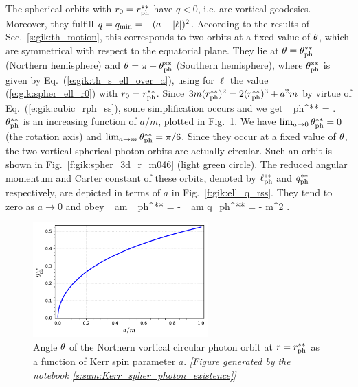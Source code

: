The spherical orbits with $r_0 = r_{\rm ph}^{**}$ have
$q < 0$, i.e. are vortical geodesics. Moreover, they fulfill $q=q_{\rm min}=-(a - |\ell|)^2$.
According to the results of Sec.~\ref{s:gik:th_motion}, this corresponds to two orbits at
a fixed value of $\theta$, which are symmetrical with respect to the equatorial plane.
They lie at $\theta = \theta_{\rm ph}^{**}$ (Northern hemisphere) and
$\theta = \pi - \theta_{\rm ph}^{**}$ (Southern hemisphere), where
$\theta_{\rm ph}^{**}$ is given by Eq.~(\ref{e:gik:th_s_ell_over_a}), using
for $\ell$ the value (\ref{e:gik:spher_ell_r0}) with $r_0 = r_{\rm ph}^{**}$.
Since $3 m (r_{\rm ph}^{**})^2 = 2 (r_{\rm ph}^{**})^3 + a^2 m$ by virtue of
Eq.~(\ref{e:gik:cubic_rph_ss}), some simplification occurs and we get
\be
    \th_{\rm ph}^{**} =  \arcsin{} .
\ee
$\theta_{\rm ph}^{**}$ is an increasing function of $a/m$, plotted in Fig.~\ref{f:gik:theta_ss}.
We have $\lim_{a\to 0} \theta_{\rm ph}^{**} = 0$ (the rotation axis) and
$\lim_{a\to m} \theta_{\rm ph}^{**} = \pi/6$.
Since they occur at a fixed value of $\theta$, the two vortical spherical photon orbits
are actually circular. Such an orbit is shown in Fig.~\ref{f:gik:spher_3d_r_m046}
(light green circle).
The reduced angular momentum and Carter constant of these orbits,
denoted by $\ell_{\rm ph}^{**}$ and
$q_{\rm ph}^{**}$ respectively,
are depicted in terms of $a$ in Fig.~\ref{f:gik:ell_q_rss}.
They tend to zero as $a\to 0$ and obey
\be
    \lim_{a\to m} \ell_{\rm ph}^{**} = -  \qand
    \lim_{a\to m} q_{\rm ph}^{**} = -  m^2 .
\ee

\begin{figure}
\centerline{\includegraphics[width=0.6\textwidth]{gik_theta_ss.pdf}}
\caption[]{\label{f:gik:theta_ss} \footnotesize
Angle $\theta$ of the Northern vortical circular photon orbit at $r = r_{\rm ph}^{**}$ as a
function of Kerr spin parameter $a$.
\textsl{[Figure generated by the notebook \ref{s:sam:Kerr_spher_photon_existence}]}
}
\end{figure}

